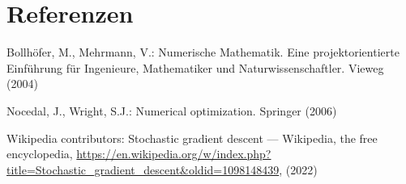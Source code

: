 \documentclass[]{book}
\theoremstyle{definition}
\theoremstyle{definition}
\theoremstyle{definition}
\theoremstyle{definition}
\theoremstyle{remark}
\begin{document}
\hypertarget{referenzen}{%
\chapter*{Referenzen}\label{referenzen}}

\hypertarget{refs}{}
\leavevmode\hypertarget{ref-BolM04}{}%
Bollhöfer, M., Mehrmann, V.: Numerische Mathematik. Eine projektorientierte Einführung für Ingenieure, Mathematiker und Naturwissenschaftler. Vieweg (2004)

\leavevmode\hypertarget{ref-NocW06}{}%
Nocedal, J., Wright, S.J.: Numerical optimization. Springer (2006)

\leavevmode\hypertarget{ref-enwiki:1098148439}{}%
Wikipedia contributors: Stochastic gradient descent --- Wikipedia, the free encyclopedia, \url{https://en.wikipedia.org/w/index.php?title=Stochastic_gradient_descent\&oldid=1098148439}, (2022)
\end{document}
